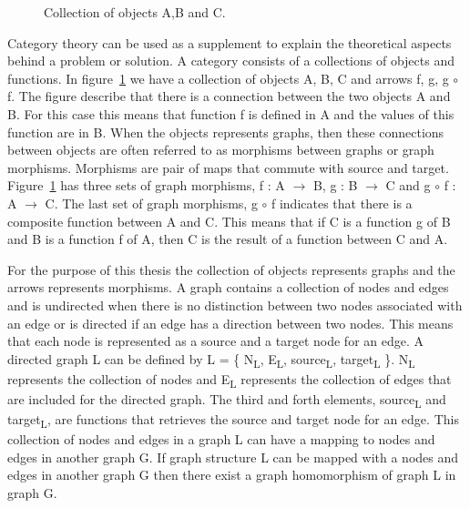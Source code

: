\begin{figure}[H]
	\centering
	\caption[Category Theory]
	{Collection of objects A,B and C.}
	\label{fig:categoryTheory}
\end{figure}

Category theory can be used as a supplement to explain the theoretical aspects
behind a problem or solution. A category consists of a collections of
objects and functions. In figure~\ref{fig:categoryTheory} we have a collection
of objects A, B, C and arrows f, g, g $\circ$ f. The figure describe that
there is a connection between the two objects A and B. For this case
this means that function f is defined in A and the values of this function are
in B. When the objects represents graphs, then these connections between objects
are often referred to as morphisms between graphs or graph morphisms. Morphisms
are pair of maps that commute with source and target\cite{Brown2008}.
Figure~\ref{fig:categoryTheory} has three sets of graph morphisms, f : A
$\longrightarrow$ B, g : B $\longrightarrow$ C and g $\circ$ f : A
$\longrightarrow$ C. The last set of graph morphisms, g $\circ$ f indicates that
there is a composite function between A and C. This means that if
C is a function g of B and B is a function f of A, then C is the result of a
function between C and A. 

For the purpose of this thesis the collection of objects represents graphs and
the arrows represents morphisms. A graph contains a collection of nodes and
edges and is undirected when there is no distinction between two nodes
associated with an edge or is directed if an edge has a direction
between two nodes. This means that each node is represented as a source and a
target node for an edge. A directed graph L can be defined by L = \{
N\textsubscript{L}, E\textsubscript{L}, source\textsubscript{L},
target\textsubscript{L} \}. N\textsubscript{L} represents the collection of
nodes and E\textsubscript{L} represents the collection of edges that are
included for the directed graph. The third and forth elements,
source\textsubscript{L} and target\textsubscript{L}, are functions that
retrieves the source and target node for an edge. This collection of nodes and
edges in a graph L can have a mapping to nodes and edges in another graph G.
If graph structure L can be mapped with a nodes and edges in another graph G
then there exist a graph homomorphism of graph L in graph G.

